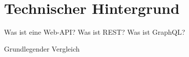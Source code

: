 \chapter{Technischer Hintergrund}


Was ist eine Web-API?
Was ist REST?
Was ist GraphQL?

Grundlegender Vergleich